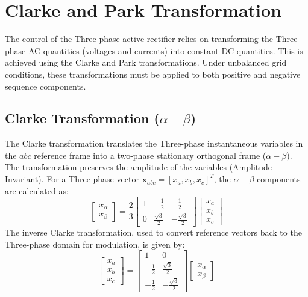\chapter{Clarke and Park Transformation}\label{App:ClarkeParkTransformation}
The control of the Three-phase active rectifier relies on transforming the Three-phase AC quantities
(voltages and currents) into constant DC quantities. This is achieved using the Clarke and Park transformations.
Under unbalanced grid conditions, these transformations must be applied to both positive and negative sequence components.
\section{Clarke Transformation (\texorpdfstring{$\alpha-\beta$}{alphabeta})}
The Clarke transformation translates the Three-phase instantaneous variables in the $abc$ reference frame into a
two-phase stationary orthogonal frame ($\alpha-\beta$). The transformation preserves the amplitude of the variables (Amplitude Invariant).
For a Three-phase vector $\mathbf{x}_{abc} = [x_a, x_b, x_c]^T$, the $\alpha-\beta$ components are calculated as:
\begin{equation}
    \begin{bmatrix}
        x_{\alpha} \\
        x_{\beta}
    \end{bmatrix}
    = \frac{2}{3}
    \begin{bmatrix}
        1 & -\frac{1}{2}       & -\frac{1}{2}        \\
        0 & \frac{\sqrt{3}}{2} & -\frac{\sqrt{3}}{2}
    \end{bmatrix}
    \begin{bmatrix}
        x_a \\
        x_b \\
        x_c
    \end{bmatrix}
\end{equation}
The inverse Clarke transformation, used to convert reference vectors back to the Three-phase domain for modulation, is given by:
\begin{equation}
    \begin{bmatrix}
        x_a \\
        x_b \\
        x_c
    \end{bmatrix}
    =
    \begin{bmatrix}
        1            & 0                   \\
        -\frac{1}{2} & \frac{\sqrt{3}}{2}  \\
        -\frac{1}{2} & -\frac{\sqrt{3}}{2}
    \end{bmatrix}
    \begin{bmatrix}
        x_{\alpha} \\
        x_{\beta}
    \end{bmatrix}
\end{equation}
